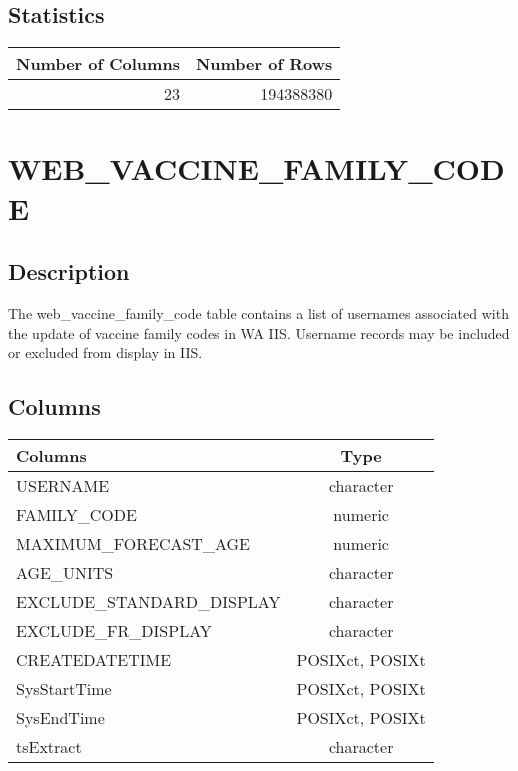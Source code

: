\documentclass[
  letterpaper,
  DIV=11,
  numbers=noendperiod]{scrreprt}
\begin{document}
\hypertarget{statistics-52}{%
\section*{Statistics}\label{statistics-52}}

\begin{longtable}{rr}
\toprule
Number of Columns & Number of Rows \\ 
\midrule
23 & 194388380 \\ 
\bottomrule
\end{longtable}

\hypertarget{web_vaccine_family_code}{%
\chapter*{WEB\_VACCINE\_FAMILY\_CODE}\label{web_vaccine_family_code}}

\hypertarget{description-53}{%
\section*{Description}\label{description-53}}

The web\_vaccine\_family\_code table contains a list of usernames
associated with the update of vaccine family codes in WA IIS. Username
records may be included or excluded from display in IIS.

\hypertarget{columns-53}{%
\section*{Columns}\label{columns-53}}

\begin{longtable}{lc}
\toprule
Columns & Type \\ 
\midrule
USERNAME & character \\ 
FAMILY\_CODE & numeric \\ 
MAXIMUM\_FORECAST\_AGE & numeric \\ 
AGE\_UNITS & character \\ 
EXCLUDE\_STANDARD\_DISPLAY & character \\ 
EXCLUDE\_FR\_DISPLAY & character \\ 
CREATEDATETIME & POSIXct, POSIXt \\ 
SysStartTime & POSIXct, POSIXt \\ 
SysEndTime & POSIXct, POSIXt \\ 
tsExtract & character \\ 
\bottomrule
\end{longtable}
\end{document}
